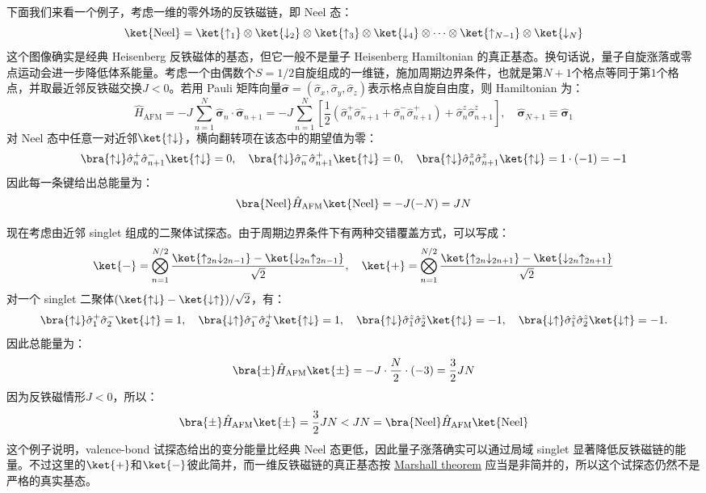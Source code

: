下面我们来看一个例子，考虑一维的零外场的反铁磁链，即 Neel 态：
\[\ket{\mathrm{Neel}}=\ket{\uparrow_1}\otimes\ket{\downarrow_2}\otimes\ket{\uparrow_3}\otimes\ket{\downarrow_4}\otimes\cdots\otimes\ket{\uparrow_{N-1}}\otimes\ket{\downarrow_N}\]
这个图像确实是经典 Heisenberg 反铁磁体的基态，但它一般不是量子 Heisenberg Hamiltonian 的真正基态。换句话说，量子自旋涨落或零点运动会进一步降低体系能量。考虑一个由偶数个$S=1/2$自旋组成的一维链，施加周期边界条件，也就是第$N+1$个格点等同于第$1$个格点，并取最近邻反铁磁交换$J<0$。若用 Pauli 矩阵向量$\hat{\boldsymbol{\sigma}}=(\hat{\sigma}_x,\hat{\sigma}_y,\hat{\sigma}_z)$表示格点自旋自由度，则 Hamiltonian 为：
\[\hat H_{\mathrm{AFM}}=-J\sum_{n=1}^{N}\hat{\boldsymbol{\sigma}}_n\cdot\hat{\boldsymbol{\sigma}}_{n+1}
=-J\sum_{n=1}^{N}\left[\frac{1}{2}\left(\hat{\sigma}_n^+\hat{\sigma}_{n+1}^-+\hat{\sigma}_n^-\hat{\sigma}_{n+1}^+\right)+\hat{\sigma}_n^z\hat{\sigma}_{n+1}^z\right],\quad \hat{\boldsymbol{\sigma}}_{N+1}\equiv \hat{\boldsymbol{\sigma}}_1\]
对 Neel 态中任意一对近邻$\ket{\uparrow\downarrow}$，横向翻转项在该态中的期望值为零：
\[\bra{\uparrow\downarrow}\hat{\sigma}_n^+\hat{\sigma}_{n+1}^-\ket{\uparrow\downarrow}=0, \quad \bra{\uparrow\downarrow}\hat{\sigma}_n^-\hat{\sigma}_{n+1}^+\ket{\uparrow\downarrow}=0, \quad \bra{\uparrow\downarrow}\hat{\sigma}_n^z\hat{\sigma}_{n+1}^z\ket{\uparrow\downarrow}=1\cdot(-1)=-1\]
因此每一条键给出总能量为：
\[\bra{\mathrm{Neel}}\hat H_{\mathrm{AFM}}\ket{\mathrm{Neel}}=-J(-N)=JN\]

现在考虑由近邻 singlet 组成的二聚体试探态。由于周期边界条件下有两种交错覆盖方式，可以写成：
\[\ket{-}=\bigotimes_{n=1}^{N/2}\frac{\ket{\uparrow_{2n}\downarrow_{2n-1}}-\ket{\downarrow_{2n}\uparrow_{2n-1}}}{\sqrt{2}},\quad \ket{+}=\bigotimes_{n=1}^{N/2}\frac{\ket{\uparrow_{2n}\downarrow_{2n+1}}-\ket{\downarrow_{2n}\uparrow_{2n+1}}}{\sqrt{2}}\]
对一个 singlet 二聚体$(\ket{\uparrow\downarrow}-\ket{\downarrow\uparrow})/\sqrt{2}$，有：
\[\bra{\uparrow\downarrow}\hat{\sigma}_1^+\hat{\sigma}_2^-\ket{\downarrow\uparrow}=1,\quad \bra{\downarrow\uparrow}\hat{\sigma}_1^-\hat{\sigma}_2^+\ket{\uparrow\downarrow}=1, \quad \bra{\uparrow\downarrow}\hat{\sigma}_1^z\hat{\sigma}_2^z\ket{\uparrow\downarrow}=-1,\quad \bra{\downarrow\uparrow}\hat{\sigma}_1^z\hat{\sigma}_2^z\ket{\downarrow\uparrow}=-1.\]
因此总能量为：
\[\bra{\pm}\hat H_{\mathrm{AFM}}\ket{\pm}=-J\cdot\frac{N}{2}\cdot(-3)=\frac{3}{2}JN\]
因为反铁磁情形$J<0$，所以：
\[\bra{\pm}\hat H_{\mathrm{AFM}}\ket{\pm}=\frac{3}{2}JN<JN=\bra{\mathrm{Neel}}\hat H_{\mathrm{AFM}}\ket{\mathrm{Neel}}\]
这个例子说明，valence-bond 试探态给出的变分能量比经典 Neel 态更低，因此量子涨落确实可以通过局域 singlet 显著降低反铁磁链的能量。不过这里的$\ket{+}$和$\ket{-}$彼此简并，而一维反铁磁链的真正基态按 \href{https://iopscience.iop.org/article/10.1088/0953-8984/10/42/003/pdf}{Marshall theorem} 应当是非简并的，所以这个试探态仍然不是严格的真实基态。

